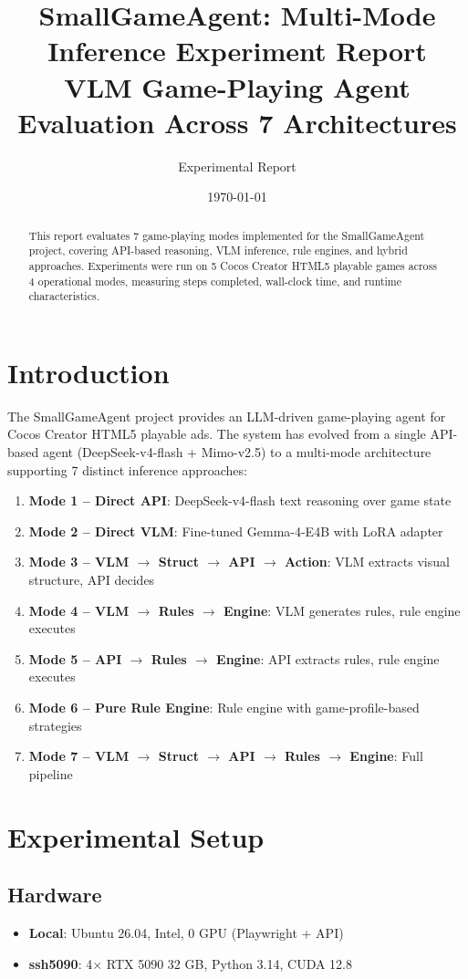 \documentclass[11pt,a4paper]{article}
\title{\vspace{-2cm}
  \textbf{SmallGameAgent: Multi-Mode Inference Experiment Report}\\
  \large VLM Game-Playing Agent Evaluation Across 7 Architectures
}
\author{Experimental Report}
\date{\today}
\begin{document}
\maketitle

\begin{abstract}
This report evaluates 7 game-playing modes implemented for the SmallGameAgent project, 
covering API-based reasoning, VLM inference, rule engines, and hybrid approaches. 
Experiments were run on 5 Cocos Creator HTML5 playable games across 4 operational modes, 
measuring steps completed, wall-clock time, and runtime characteristics.
\end{abstract}

\section{Introduction}

The SmallGameAgent project provides an LLM-driven game-playing agent for Cocos Creator 
HTML5 playable ads. The system has evolved from a single API-based agent (DeepSeek-v4-flash + 
Mimo-v2.5) to a multi-mode architecture supporting 7 distinct inference approaches:

\begin{enumerate}
  \item \textbf{Mode 1 -- Direct API}: DeepSeek-v4-flash text reasoning over game state
  \item \textbf{Mode 2 -- Direct VLM}: Fine-tuned Gemma-4-E4B with LoRA adapter
  \item \textbf{Mode 3 -- VLM $\to$ Struct $\to$ API $\to$ Action}: VLM extracts visual structure, API decides
  \item \textbf{Mode 4 -- VLM $\to$ Rules $\to$ Engine}: VLM generates rules, rule engine executes
  \item \textbf{Mode 5 -- API $\to$ Rules $\to$ Engine}: API extracts rules, rule engine executes
  \item \textbf{Mode 6 -- Pure Rule Engine}: Rule engine with game-profile-based strategies
  \item \textbf{Mode 7 -- VLM $\to$ Struct $\to$ API $\to$ Rules $\to$ Engine}: Full pipeline
\end{enumerate}

\section{Experimental Setup}

\subsection{Hardware}
\begin{itemize}
  \item \textbf{Local}: Ubuntu 26.04, Intel, 0 GPU (Playwright + API)
  \item \textbf{ssh5090}: 4$\times$ RTX 5090 32 GB, Python 3.14, CUDA 12.8
\end{itemize}
\end{document}
